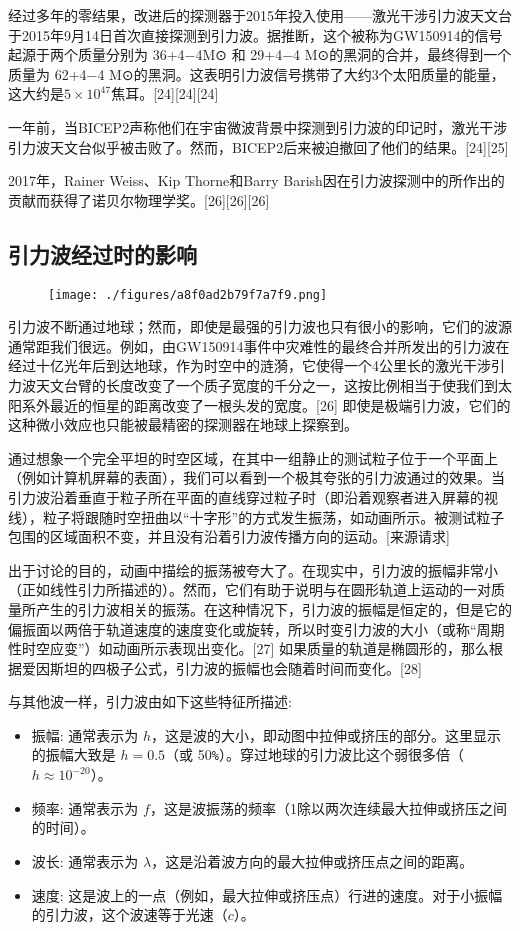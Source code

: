 经过多年的零结果，改进后的探测器于2015年投入使用——激光干涉引力波天文台于2015年9月14日首次直接探测到引力波。据推断，这个被称为GW150914的信号起源于两个质量分别为 36+4−4M⊙ 和 29+4−4 M⊙的黑洞的合并，最终得到一个质量为 62+4−4 M⊙的黑洞。这表明引力波信号携带了大约3个太阳质量的能量，这大约是$ 5\times10^{47}$焦耳。[24][24][24]

一年前，当BICEP2声称他们在宇宙微波背景中探测到引力波的印记时，激光干涉引力波天文台似乎被击败了。然而，BICEP2后来被迫撤回了他们的结果。[24][25]

2017年，Rainer Weiss、Kip Thorne和Barry Barish因在引力波探测中的所作出的贡献而获得了诺贝尔物理学奖。[26][26][26]

\subsection{引力波经过时的影响}

\begin{figure}[ht]
\centering
\texttt{[image: ./figures/a8f0ad2b79f7a7f9.png]}
\caption \label{fig_YLB_4}
\end{figure}

引力波不断通过地球；然而，即使是最强的引力波也只有很小的影响，它们的波源通常距我们很远。例如，由GW150914事件中灾难性的最终合并所发出的引力波在经过十亿光年后到达地球，作为时空中的涟漪，它使得一个4公里长的激光干涉引力波天文台臂的长度改变了一个质子宽度的千分之一，这按比例相当于使我们到太阳系外最近的恒星的距离改变了一根头发的宽度。[26] 即使是极端引力波，它们的这种微小效应也只能被最精密的探测器在地球上探察到。

通过想象一个完全平坦的时空区域，在其中一组静止的测试粒子位于一个平面上（例如计算机屏幕的表面），我们可以看到一个极其夸张的引力波通过的效果。当引力波沿着垂直于粒子所在平面的直线穿过粒子时（即沿着观察者进入屏幕的视线），粒子将跟随时空扭曲以“十字形”的方式发生振荡，如动画所示。被测试粒子包围的区域面积不变，并且没有沿着引力波传播方向的运动。[来源请求]

出于讨论的目的，动画中描绘的振荡被夸大了。在现实中，引力波的振幅非常小（正如线性引力所描述的）。然而，它们有助于说明与在圆形轨道上运动的一对质量所产生的引力波相关的振荡。在这种情况下，引力波的振幅是恒定的，但是它的偏振面以两倍于轨道速度的速度变化或旋转，所以时变引力波的大小（或称“周期性时空应变”）如动画所示表现出变化。[27] 如果质量的轨道是椭圆形的，那么根据爱因斯坦的四极子公式，引力波的振幅也会随着时间而变化。[28]

与其他波一样，引力波由如下这些特征所描述:

\begin{itemize}
\item 振幅: 通常表示为 $h$，这是波的大小，即动图中拉伸或挤压的部分。这里显示的振幅大致是 $h = 0.5$（或 50\verb`%`）。穿过地球的引力波比这个弱很多倍（$h \approx 10^{-20}$）。
\item 频率: 通常表示为 $f$，这是波振荡的频率（1除以两次连续最大拉伸或挤压之间的时间）。
\item 波长: 通常表示为 $\lambda$，这是沿着波方向的最大拉伸或挤压点之间的距离。
\item 速度: 这是波上的一点（例如，最大拉伸或挤压点）行进的速度。对于小振幅的引力波，这个波速等于光速（$c$）。
\end{itemize}

